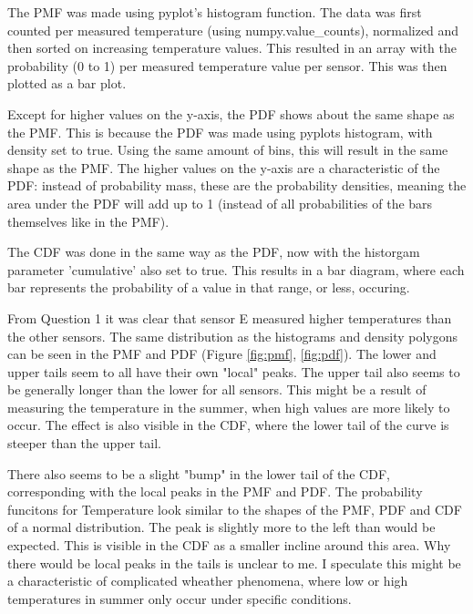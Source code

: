 \documentclass{report}
\begin{document}
	 The PMF was made using pyplot's histogram function. The data was first counted per measured temperature (using numpy.value\_counts), normalized and then sorted on increasing temperature values. This resulted in an array with the probability (0 to 1) per measured temperature value per sensor. This was then plotted as a bar plot.
	
	Except for higher values on the y-axis, the PDF shows about the same shape as the PMF. This is because the PDF was made using pyplots histogram, with density set to true. Using the same amount of bins, this will result in the same shape as the PMF. The higher values on the y-axis are a characteristic of the PDF: instead of probability mass, these are the probability densities, meaning the area under the PDF will add up to 1 (instead of all probabilities of the bars themselves like in the PMF).
	
	The CDF was done in the same way as the PDF, now with the historgam parameter 'cumulative' also set to true. This results in a bar diagram, where each bar represents the probability of a value in that range, or less, occuring.
	
	From Question 1 it was clear that sensor E measured higher temperatures than the other sensors. The same distribution as the histograms and density polygons can be seen in the PMF and PDF (Figure \ref{fig:pmf}, \ref{fig:pdf}). The lower and upper tails seem to all have their own "local" peaks. The upper tail also seems to be generally longer than the lower for all sensors. This might be a result of measuring the temperature in the summer, when high values are more likely to occur. The effect is also visible in the CDF, where the lower tail of the curve is steeper than the upper tail. 
	
	\newpage
	There also seems to be a slight "bump" in the lower tail of the CDF, corresponding with the local peaks in the PMF and PDF. The probability funcitons for Temperature look similar to the shapes of the PMF, PDF and CDF of a normal distribution. The peak is slightly more to the left than would be expected. This is visible in the CDF as a smaller incline around this area. Why there would be local peaks in the tails is unclear to me. I speculate this might be a characteristic of complicated wheather phenomena, where low or high temperatures in summer only occur under specific conditions.
	
\end{document}
